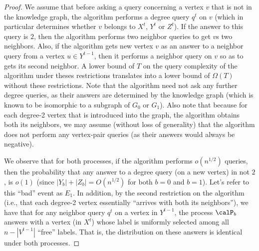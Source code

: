 \begin{proof}
We assume that before asking a query concerning a vertex $v$ that is not in the knowledge graph, the algorithm performs a degree query $q^t$ on $v$ (which in particular determines whether $v$ belongs to $X^t$, $Y^t$ or $Z^t$).
If the answer to this query is $2$, then the algorithm performs two neighbor queries to get $v$s two neighbors.
Also, if the algorithm gets new vertex $v$ as an answer to a neighbor query from a vertex
$u \in Y^{t-1}$, then it performs a neighbor query on $v$ so as to gets its second neighbor.
A lower bound of $T$ on the query complexity of the algorithm under theses restrictions translates into a lower bound of $\Omega(T)$ without these restrictions. Note that the algorithm need not ask any further degree queries, as their answers are determined by the knowledge graph (which is known to be isomorphic to a subgraph of $G_0$ or $G_1$). Also note that because for each degree-2 vertex that is introduced into the graph, the algorithm obtains both its neighbors, we may assume (without loss of generality) that the algorithm does not perform any vertex-pair queries (as their answers would always be negative).


We observe that for both processes, if the algorithm performs $o(n^{1/2})$ queries, then the probability that any answer to a degree query (on a new vertex) in not $2$, is $o(1)$ (since $|Y_b|+|Z_b| = O(n^{1/2})$ for both $b=0$ and $b=1$). Let's refer to this ``bad'' event as $E_1$.
In addition, by the second restriction on the algorithm (i.e., that each degree-2 vertex essentially ``arrives with both its neighbors''), we have that for any neighbor query $q^t$ on a vertex in $Y^{t-1}$, the process $\calP_b$ answers with a vertex (in $X^t$) whose label is uniformly selected among all $n-|V^{t-1}|$ ``free'' labels. That is, the distribution on these answers is identical under both processes.





\end{proof}
